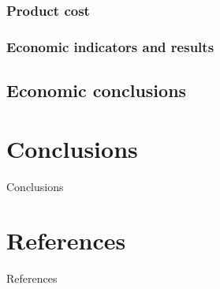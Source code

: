 \documentclass[12pt,a4paper]{report}
\begin{document}
\subsection{Product cost}
\subsection{Economic indicators and results}
\section{Economic conclusions}

\chapter*{Conclusions}
Conclusions

\chapter*{References}
References
\end{document}

